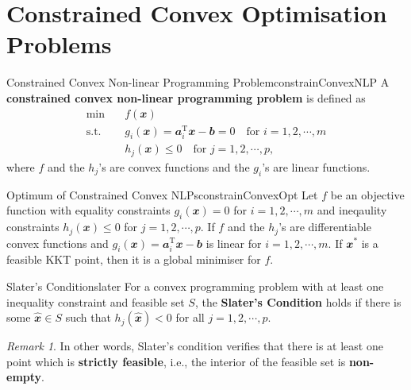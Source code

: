 \documentclass[math, code]{amznotes}
\theoremstyle{remark}
\newtheorem*{remark}{Remark}
\begin{document}
\section{Constrained Convex Optimisation Problems}
\begin{dfnbox}{Constrained Convex Non-linear Programming Problem}{constrainConvexNLP}
    A {\color{red} \textbf{constrained convex non-linear programming problem}} is defined as
    \begin{align*}
        \min & \quad f(\mathbfit{x}) \\
        \mathrm{s.t.} & \quad g_i(\mathbfit{x}) = \mathbfit{a}_i^{\mathrm{T}}\mathbfit{x} - \mathbfit{b} = 0 \quad\textrm{for } i = 1, 2, \cdots, m \\
        & \quad h_j(\mathbfit{x}) \leq 0 \quad\textrm{for } j = 1, 2, \cdots, p,
    \end{align*}
    where $f$ and the $h_j$'s are convex functions and the $g_i$'s are linear functions. 
\end{dfnbox}
\begin{thmbox}{Optimum of Constrained Convex NLPs}{constrainConvexOpt}
    Let $f$ be an objective function with equality constraints $g_i(\mathbfit{x}) = 0$ for $i = 1, 2, \cdots, m$ and ineqaulity constraints $h_j(\mathbfit{x}) \leq 0$ for $j = 1, 2, \cdots, p$. If $f$ and the $h_j$'s are differentiable convex functions and $g_i(\mathbfit{x}) = \mathbfit{a}_i^{\mathrm{T}}\mathbfit{x} - \mathbfit{b}$ is linear for $i = 1, 2, \cdots, m$. If $\mathbfit{x}^*$ is a feasible KKT point, then it is a global minimiser for $f$.
\end{thmbox}
\begin{dfnbox}{Slater's Condition}{slater}
    For a convex programming problem with at least one inequality constraint and feasible set $S$, the {\color{red} \textbf{Slater's Condition}} holds if there is some $\hat{\mathbfit{x}} \in S$ such that $h_j(\hat{\mathbfit{x}}) < 0$ for all $j = 1, 2, \cdots, p$.
\end{dfnbox}
\begin{notebox}
    \begin{remark}
        In other words, Slater's condition verifies that there is at least one point which is {\color{red} \textbf{strictly feasible}}, i.e., the interior of the feasible set is {\color{red} \textbf{non-empty}}.
    \end{remark}
\end{notebox}
\end{document}
